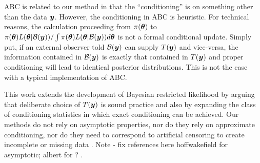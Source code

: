 \documentclass[12pt]{article}
\def\bth{\mbox{\boldmath $\theta$}}
\newcommand{\by}{\mbox{\boldmath $y$}}
\newcommand{\green}[1]{{\color{green}#1}}
\begin{document}
\green{ABC is related to our method in that the ``conditioning'' is on something other than the data $\by$.  However, the conditioning in ABC is heuristic.  For technical reasons, the calculation proceeding from $\pi(\bth)$ to $\pi(\bth)L(\bth| \mathcal{B}(\by))/\int \pi(\bth)L(\bth| \mathcal{B}(\by)) d\bth$ is not a formal conditional update.  Simply put, if an external observer told $\mathcal{B}(\by)$ can supply $T(\by)$ and vice-versa, the information contained in $\mathcal{B}(\by)$ is exactly that contained in $T(\by)$ and proper conditioning will lead to identical posterior distributions.  This is not the case with a typical implementation of ABC.}  


This work extends the development of Bayesian restricted likelihood by arguing \green{that deliberate choice of $T(\by)$} is sound practice and also by expanding the class of conditioning statistics in which exact conditioning can be achieved. %
Our methods do not rely on asymptotic properties, \green{nor do they rely on} approximate conditioning, \green{nor do they need to correspond to artificial censoring to create incomplete or missing data}  \citep[e.g.,][]{albert1988, hoffwakefield2013}.  
\green{Note - fix references here hoffwakefield for asymptotic; albert for ? .}  
\end{document}
